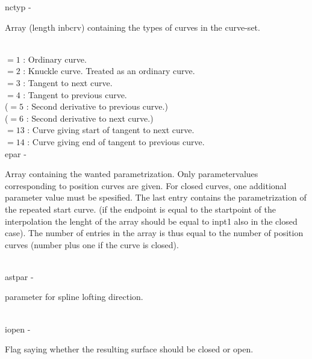        \>\>    {\fov nctyp}\> - \>  \begin{minipg2}
                     Array (length inbcrv) containing the types
                       of curves in the curve-set.
                               \end{minipg2}\\[0.8ex]
                \>\>\>\> $=1$ \> : Ordinary curve.\\
                \>\>\>\> $=2$ \> : Knuckle curve. Treated as an ordinary curve.\\
                \>\>\>\> $=3$ \> : Tangent to next curve.\\
                \>\>\>\> $=4$ \> : Tangent to previous curve.\\
                \>\>\>\> ($=5$ \> : Second derivative to previous curve.)\\
                \>\>\>\> ($=6$ \> : Second derivative to next curve.)\\
                \>\>\>\> $=13$ \> : Curve giving start of tangent to next curve.\\
                \>\>\>\> $=14$ \> : Curve giving end of tangent to previous curve.\\
        \>\>    {\fov epar}\> - \>  \begin{minipg2}
                     Array containing the wanted parametrization. Only
                       parametervalues corresponding to position
                       curves are given. For closed curves, one additional
                       parameter value must be spesified. The last entry
                       contains the parametrization of the repeated start
                       curve. (if the endpoint is equal to the startpoint
                       of the interpolation the lenght of the array should
                       be equal to inpt1 also in the closed case). The
                       number of entries in the array is thus equal to
                       the number of position curves (number plus one
                       if the curve is closed).
                               \end{minipg2}\\
        \>\>    {\fov astpar}\> - \>  \begin{minipg2}
                    parameter for spline lofting direction.
                               \end{minipg2}\\
        \>\>    {\fov iopen}\> - \>  \begin{minipg2}
                     Flag saying whether the resulting surface should
                       be closed or open.
                               \end{minipg2}\\

